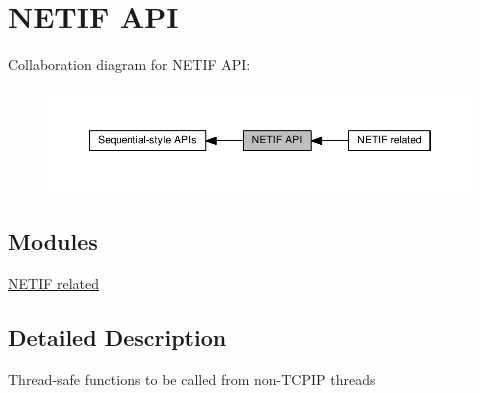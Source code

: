 \hypertarget{group__netifapi}{}\section{N\+E\+T\+IF A\+PI}
\label{group__netifapi}
Collaboration diagram for N\+E\+T\+IF A\+PI\+:
\nopagebreak
\begin{figure}[H]
\begin{center}
\leavevmode
\includegraphics[width=350pt]{group__netifapi}
\end{center}
\end{figure}
\subsection*{Modules}
\begin{DoxyCompactItemize}
\item 
\hyperlink{group__netifapi__netif}{N\+E\+T\+I\+F related}
\end{DoxyCompactItemize}


\subsection{Detailed Description}
Thread-\/safe functions to be called from non-\/\+T\+C\+P\+IP threads 